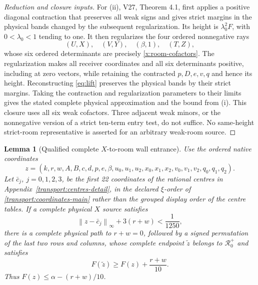 \documentclass[11pt,reqno]{amsart}
\newtheorem{lemma}[theorem]{Lemma}
\theoremstyle{definition}
\theoremstyle{remark}
\newcommand{\iin}[1]{\left\|#1\right\|_\infty}
\begin{document}
\begin{proof}[Reduction and closure inputs]
For \textup{(ii)}, V27, Theorem 4.1, first applies a positive
diagonal contraction that preserves all weak signs and gives strict
margins in the physical bands changed by the subsequent regularization.
Its height is \(\lambda_0^2F\), with
\(0<\lambda_0<1\) tending to one.  It then regularizes the four
ordered nonnegative rays
\[
 (U,X),\quad(V,Y),\quad(\beta,1),\quad(T,Z),
\]
whose six ordered determinants are precisely
\eqref{x:room-cofactors}.  The regularization makes all receiver
coordinates and all six determinants positive, including at zero
vectors, while retaining the contracted \(p,D,e,v,q\) and hence
its height.  Reconstructing \eqref{eq:lift} preserves the physical
bands by their strict margins.  Taking the contraction and
regularization parameters to their limits gives the stated complete
physical approximation and the bound from \textup{(i)}.
This closure uses all six weak cofactors.  Three adjacent weak
minors, or the nonnegative version of a strict ten-term entry test,
do not suffice.  No same-height strict-room representative is
asserted for an arbitrary weak-room source.
\end{proof}

\begin{lemma}[Qualified complete \(X\)-to-room wall entrance]
\label{x:wall-entrance}
Use the ordered native coordinates
\[
 z=(k,r,w,A,B,c,d,p,e,\beta,u_0,u_1,u_2,x_0,x_1,x_2,
       v_0,v_1,v_2,q_0,q_1,q_2).
\]
Let \(\bar c_j\), \(j=0,1,2,3\), be the first 22 coordinates
of the rational centres in Appendix~\ref{transport:centres-detail},
in the declared \(\xi\)-order of \eqref{transport:coordinates-main}
rather than the grouped display order of the centre tables.
If a complete physical \(X\) source satisfies
\begin{equation}\label{x:wall-qualification}
 \iin{z-\bar c_j}+3(r+w)<\frac1{1250},
\end{equation}
there is a complete physical path to \(r+w=0\), followed by a
signed permutation of the last two rows and columns, whose complete
endpoint \(\widetilde z\) belongs to \(\mathcal R_0^+\) and satisfies
\[
 F(\widetilde z)\ge F(z)+\frac{r+w}{10}.
\]
Thus \(F(z)\le\alpha-(r+w)/10\).
\end{lemma}
\end{document}
